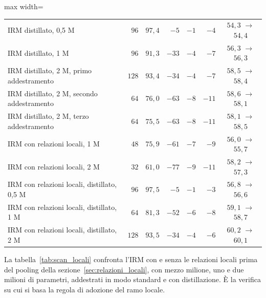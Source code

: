 \begin{table}[ht]
\begin{adjustbox}{max width=\textwidth}
\begin{tabular}{@{}l r r r r r c@{}}
\quad IRM distillato, 0,5 M & $96$ & $97{,}4$ & $-5$ & $-1$ & $-4$ & $54{,}3$ $\to$ $54{,}4$ \\
\quad IRM distillato, 1 M & $96$ & $91{,}3$ & $-33$ & $-4$ & $-7$ & $56{,}3$ $\to$ $56{,}3$ \\
\quad IRM distillato, 2 M, primo addestramento & $128$ & $93{,}4$ & $-34$ & $-4$ & $-7$ & $58{,}5$ $\to$ $58{,}4$ \\
\quad IRM distillato, 2 M, secondo addestramento & $64$ & $76{,}0$ & $-63$ & $-8$ & $-11$ & $58{,}6$ $\to$ $58{,}1$ \\
\quad IRM distillato, 2 M, terzo addestramento & $64$ & $75{,}5$ & $-63$ & $-8$ & $-11$ & $58{,}1$ $\to$ $58{,}5$ \\
\quad IRM con relazioni locali, 1 M & $48$ & $75{,}9$ & $-61$ & $-7$ & $-9$ & $56{,}0$ $\to$ $55{,}7$ \\
\quad IRM con relazioni locali, 2 M & $32$ & $61{,}0$ & $-77$ & $-9$ & $-11$ & $58{,}2$ $\to$ $57{,}3$ \\
\quad IRM con relazioni locali, distillato, 0,5 M & $96$ & $97{,}5$ & $-5$ & $-1$ & $-3$ & $56{,}8$ $\to$ $56{,}6$ \\
\quad IRM con relazioni locali, distillato, 1 M & $64$ & $81{,}3$ & $-52$ & $-6$ & $-8$ & $59{,}1$ $\to$ $58{,}7$ \\
\quad IRM con relazioni locali, distillato, 2 M & $128$ & $93{,}5$ & $-34$ & $-4$ & $-6$ & $60{,}2$ $\to$ $60{,}1$ \\
\hline
\end{tabular}
\end{adjustbox}
\end{table}

La tabella~\ref{tab:scan_locali} confronta l'IRM con e senza le relazioni locali prima del pooling della sezione~\ref{sec:relazioni_locali}, con mezzo milione, uno e due milioni di parametri, addestrati in modo standard e con distillazione. È la verifica su cui si basa la regola di adozione del ramo locale.

